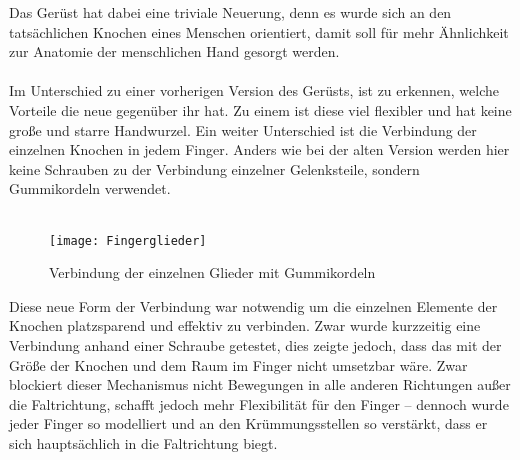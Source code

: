 \documentclass[titlepage,12pt,twoside]{article}
\begin{document}
\hfill \break
Das Gerüst hat dabei eine triviale Neuerung, denn es wurde sich an den tatsächlichen Knochen eines Menschen orientiert, damit soll für mehr Ähnlichkeit zur Anatomie der menschlichen Hand gesorgt werden. \\
\\
Im Unterschied zu einer vorherigen Version des Gerüsts, ist zu erkennen, welche Vorteile die neue gegenüber ihr hat. Zu einem ist diese viel flexibler und hat keine große und starre Handwurzel. 
Ein weiter Unterschied ist die Verbindung der einzelnen Knochen in jedem Finger. Anders wie bei der alten Version werden hier keine Schrauben zu der Verbindung einzelner Gelenksteile, sondern Gummikordeln verwendet. \\
\\
\begin{figure}[H]
	\begin{center}
		\scalebox{0.5}
		{\texttt{[image: Fingerglieder]}}
		\caption{Verbindung der einzelnen Glieder mit Gummikordeln}
		\label{fig:Fingerglieder}			
	\end{center}
\end{figure}
\hfill \break
Diese neue Form der Verbindung war notwendig um die einzelnen Elemente der Knochen platzsparend und effektiv zu verbinden. Zwar wurde kurzzeitig eine Verbindung anhand einer Schraube getestet, dies zeigte jedoch, dass das mit der Größe der Knochen 
und dem Raum im Finger nicht umsetzbar wäre. Zwar blockiert dieser Mechanismus nicht Bewegungen in alle anderen Richtungen außer die Faltrichtung, schafft jedoch mehr Flexibilität für den Finger – dennoch wurde jeder Finger so modelliert und an den 
Krümmungsstellen so verstärkt, dass er sich hauptsächlich in die Faltrichtung biegt. \\
\\
\end{document}
